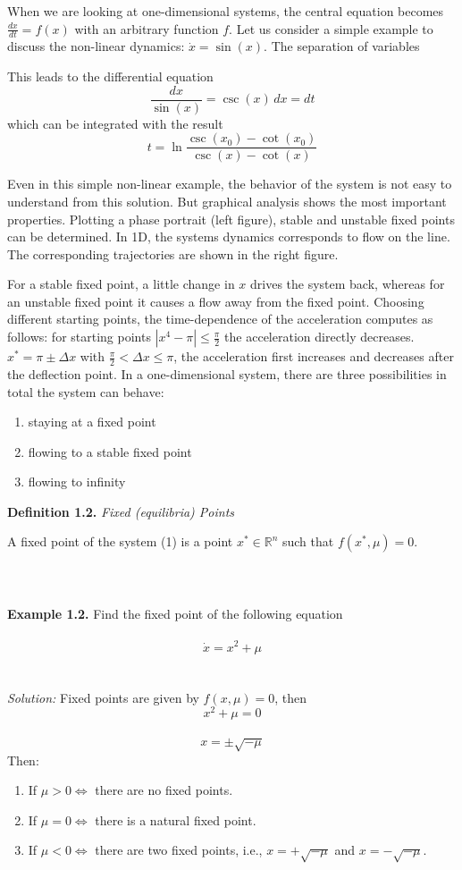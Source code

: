 \documentclass[17pt]{extarticle}
\begin{document}
When we are looking at one-dimensional systems, the central equation becomes \(\frac{dx}{dt} = f(x)\) with an arbitrary function \(f\). Let us consider a simple example to discuss the non-linear dynamics: \(\dot{x} = \sin(x)\). The separation of variables 

\newpage 



This leads to the differential equation
\[
\frac{dx}{\sin(x)} = \csc(x) \, dx = dt
\]
which can be integrated with the result
\[
t = \ln  \frac{\csc(x_0) - \cot(x_0)}{\csc(x) - \cot(x)} 
\]

Even in this simple non-linear example, the behavior of the system is not easy to understand from this solution. But graphical analysis shows the most important properties. Plotting a phase portrait (left figure), stable and unstable fixed points can be determined. In 1D, the systems dynamics corresponds to flow on the line. The corresponding trajectories are shown in the right figure.

For a stable fixed point, a little change in \(x\) drives the system back, whereas for an unstable fixed point it causes a flow away from the fixed point. Choosing different starting points, the time-dependence of the acceleration computes as follows: for starting points \(|x^4 - \pi | \leq \frac{\pi}{2}\) the acceleration directly decreases. \(x^* = \pi \pm \Delta x\) with \(\frac{\pi}{2} < \Delta x \leq \pi\), the acceleration first increases and decreases after the deflection point. In a one-dimensional system, there are three possibilities in total the system can behave:
\begin{enumerate}
    \item staying at a fixed point
    \item flowing to a stable fixed point
    \item flowing to infinity
\end{enumerate}

\noindent \textbf{Definition 1.2.} \textit{Fixed (equilibria) Points}
\newpage 

A fixed point of the system (1) is a point \(x^* \in \mathbb{R}^n\) such that \(f(x^*, \mu) = 0\). \\
\\
\\
\\
\textbf{Example 1.2.} Find the fixed point of the following equation
\\
\\
\[
\dot{x} = x^2 + \mu
\]
\\
\\
\textit{Solution:} Fixed points are given by \(f(x, \mu ) = 0\), then
\[
x^2 + \mu  = 0 
\]
\\
\[
x = \pm \sqrt{-\mu}
\]
Then:
\begin{enumerate}
    \item If \(\mu > 0 \Leftrightarrow\) there are no fixed points.
    \item If \(\mu = 0 \Leftrightarrow\) there is a natural fixed point.
    \item If \(\mu < 0 \Leftrightarrow\) there are two fixed points, i.e., \(x = +\sqrt{-\mu}\) and \(x = -\sqrt{-\mu}\).
\end{enumerate}
\end{document}
